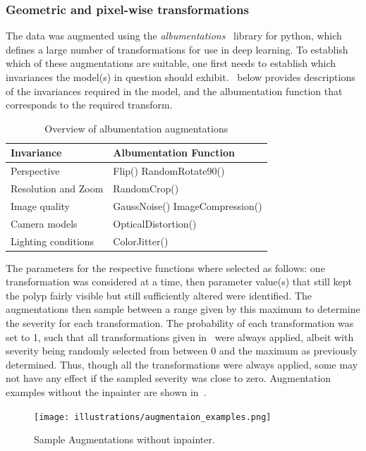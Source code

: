 \subsubsection{Geometric and pixel-wise transformations}
The data was augmented using the \textit{albumentations}~\cite{albumentations} library for python, which defines a large number of transformations for use in deep learning. To establish which of these augmentations are suitable, one first needs to establish which invariances the model(s) in question should exhibit.~ below provides descriptions of the invariances required in the model, and the albumentation function that corresponds to the required transform. 
\begin{table}[htb]
    \centering
\begin{tabularx}{\textwidth}{|X|X|}
    \toprule
    \textbf{Invariance} & \textbf{Albumentation Function}\\
    \midrule
    Perspective &Flip() \newline RandomRotate90()\\
    Resolution and Zoom & RandomCrop() \\
    Image quality &GaussNoise() \newline ImageCompression()\\
    Camera models&OpticalDistortion() \\
    Lighting conditions & ColorJitter() \\
    \bottomrule
\end{tabularx}
    \caption{Overview of albumentation augmentations}
    \label{tab:vanilla_aug}
\end{table}

The parameters for the respective functions where selected as follows: one transformation was considered at a time, then parameter value(s) that still kept the polyp fairly visible but still sufficiently altered were identified. The augmentations then sample between a range given by this maximum to determine the severity for each transformation. The probability of each transformation was set to 1, such that all transformations given in~ were always applied, albeit with severity being randomly selected from between 0 and the maximum as previously determined. Thus, though all the transformations were always applied, some may not have any effect if the sampled severity was close to zero. Augmentation examples without the inpainter are shown in~.

\begin{figure}
    \centering
    \texttt{[image: illustrations/augmentaion\_examples.png]}
    \caption{Sample Augmentations without inpainter.}
    \label{fig:sample_augmentations}
\end{figure}

